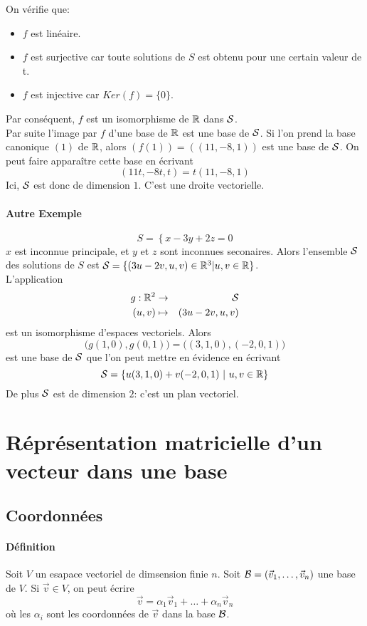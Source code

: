 On vérifie que:
\begin{itemize}
  \item $f$ est linéaire.
  \item $f$ est surjective car toute solutions de $S$ est obtenu pour une certain valeur de t.
  \item $f$ est injective car $Ker(f) = \{0\}$.
\end{itemize}
Par conséquent, $f$ est un isomorphisme de $\mathbb{R}$ dans $\mathcal{S}$. \\
Par suite l'image par $f$ d'une base de $\mathbb{R}$ est une base de $\mathcal{S}$. Si l'on prend la base canonique $(1)$ de $\mathbb{R}$, alors $(f(1)) = ((11, -8, 1))$ est une base de $\mathcal{S}$. On peut faire apparaître cette base en écrivant 
$$(11t, -8t, t) = t (11, -8, 1)$$
Ici, $\mathcal{S}$ est donc de dimension $1$. C'est une droite vectorielle.

\paragraph{Autre Exemple}
$$S = \left\{ x - 3y + 2z = 0 \right.$$
$x$ est inconnue principale, et $y$ et $z$ sont inconnues seconaires. Alors l'ensemble $\mathcal{S}$ des solutions de $S$ est $\mathcal{S} = \{(3u - 2v, u, v) \in \mathbb{R}^3 \vert u, v \in \mathbb{R} \}$. \\
L'application 
\begin{eqnarray*}  
  g: \mathbb{R}^2 &\rightarrow& \mathcal{S} \\
    (u, v) & \mapsto & (3u - 2v, u, v)
\end{eqnarray*}
est un isomorphisme d'espaces vectoriels. Alors 
$$\big(g(1, 0), g(0, 1)\big) = \big( (3, 1, 0), (-2, 0, 1) \big)$$ 
est une base de $\mathcal{S}$ que l'on peut mettre en évidence en écrivant
$$\mathcal{S} = \left\{ u(3, 1, 0) + v(-2, 0, 1) ~ \vert ~ u, v \in \mathbb{R} \right\}$$
De plus $\mathcal{S}$ est de dimension $2$: c'est un plan vectoriel.
  
%
%
\section{Réprésentation matricielle d'un vecteur dans une base}
%
%

%
\subsection{Coordonnées}
%
\paragraph{Définition} Soit $V$ un esapace vectoriel de dimsension finie $n$. Soit $\mathcal{B} = (\vec{v}_1, \ldots, \vec{v}_n)$ une base de $V$. Si $\vec{v} \in V$, on peut écrire 
$$\vec{v} = \alpha_1 \vec{v}_1 + \ldots + \alpha_n \vec{v}_n$$
où les $\alpha_i$ sont les coordonnées de $\vec{v}$ dans la base $\mathcal{B}$.

